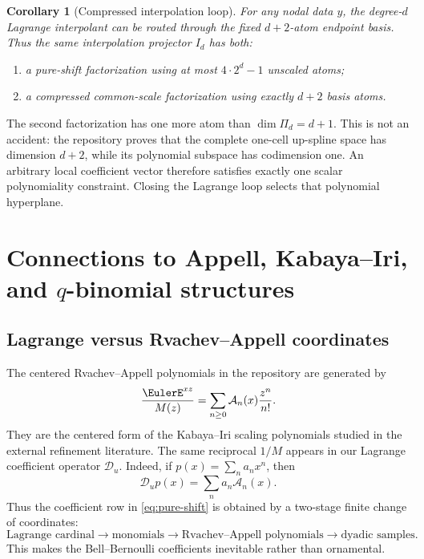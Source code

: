 \documentclass[11pt,oneside]{article}
\numberwithin{equation}{section}
\newtheorem{corollary}[theorem]{Corollary}
\theoremstyle{definition}
\theoremstyle{remark}
\newcommand{\calD}{\mathscr D_u}
\begin{document}
\begin{corollary}[Compressed interpolation loop]
\label{cor:compressed-loop}
For any nodal data \(y\), the degree-\(d\) Lagrange interpolant can be routed
through the fixed \(d+2\)-atom endpoint basis.  Thus the same interpolation
projector \(I_d\) has both:
\begin{enumerate}
\item a pure-shift factorization using at most \(4\cdot2^d-1\) unscaled atoms;
\item a compressed common-scale factorization using exactly \(d+2\) basis atoms.
\end{enumerate}
\end{corollary}

The second factorization has one more atom than \(\dim\Pi_d=d+1\).  This is not
an accident: the repository proves that the complete one-cell up-spline space has
dimension \(d+2\), while its polynomial subspace has codimension one.  An arbitrary
local coefficient vector therefore satisfies exactly one scalar polynomiality
constraint.  Closing the Lagrange loop selects that polynomial hyperplane.

\section{Connections to Appell, Kabaya--Iri, and \(q\)-binomial structures}
\label{sec:connections}

\subsection{Lagrange versus Rvachev--Appell coordinates}
The centered Rvachev--Appell polynomials in the repository are generated by
\begin{equation}
 \frac{\EulerE^{xz}}{M(z)}=\sum_{n\ge0}\mathcal A_n(x)\frac{z^n}{n!}.
 \label{eq:appell-egf}
\end{equation}
They are the centered form of the Kabaya--Iri scaling polynomials studied in the
external refinement literature.  The same reciprocal \(1/M\) appears in our
Lagrange coefficient operator \(\calD\).  Indeed, if
\(p(x)=\sum_n a_nx^n\), then
\begin{equation}
 \calD p(x)=\sum_n a_n\mathcal A_n(x).
 \label{eq:monomial-to-appell}
\end{equation}
Thus the coefficient row in \eqref{eq:pure-shift} is obtained by a two-stage finite
change of coordinates:
\begin{equation}
 \text{Lagrange cardinal}
 \longrightarrow \text{monomials}
 \longrightarrow \text{Rvachev--Appell polynomials}
 \longrightarrow \text{dyadic samples}.
 \label{eq:coordinate-chain}
\end{equation}
This makes the Bell--Bernoulli coefficients inevitable rather than ornamental.
\end{document}
